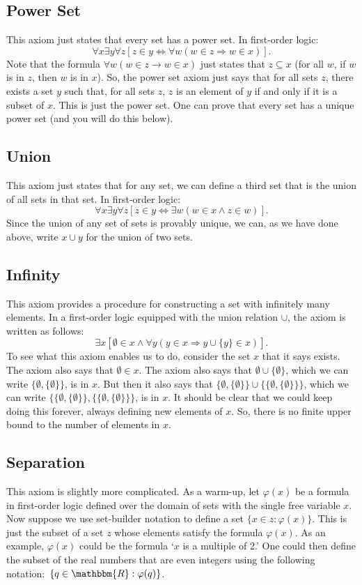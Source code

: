 \documentclass[11pt]{article}
\theoremstyle{definition}
\theoremstyle{remark}
\begin{document}
\subsection{Power Set}
This axiom just states that every set has a power set. In first-order logic:
$$\forall x \exists y \forall z \left[z\in y \iff \forall w (w\in z \Rightarrow w\in x)\right].$$
Note that the formula $\forall w (w\in z \to w\in x)$ just states that $z\subseteq x$ (for all $w$, if $w$ is in $z$, then $w$ is in $x$). So, the power set axiom just says that for all sets $z$, there exists a set $y$ such that, for all sets $z$, $z$ is an element of $y$ if and only if it is a subset of $x$. This is just the power set. One can prove that every set has a unique power set (and you will do this below). 


\subsection{Union}
This axiom just states that for any set, we can define a third set that is the union of all sets in that set. In first-order logic:
$$\forall x \exists y \forall z \left[z\in y \iff \exists w (w\in x \wedge z\in w)\right].$$
Since the union of any set of sets is provably unique, we can, as we have done above, write $x\cup y$ for the union of two sets.


\subsection{Infinity}
This axiom provides a procedure for constructing a set with infinitely many elements. In a first-order logic equipped with the union relation $\cup$, the axiom is written as follows:
$$\exists x \left[\emptyset \in x \wedge \forall y (y\in x \Rightarrow y\cup \{y\}\in x)\right].$$
To see what this axiom enables us to do, consider the set $x$ that it says exists. The axiom also says that $\emptyset\in x$. The axiom also says that $\emptyset \cup \{\emptyset\}$, which we can write $\{\emptyset,\{\emptyset\}\}$, is in $x$. But then it also says that $\{\emptyset,\{\emptyset\}\}\cup\{\{\emptyset,\{\emptyset\}\}\}$, which we can write $\{\{\emptyset,\{\emptyset\}\},\{\{\emptyset,\{\emptyset\}\}\}$, is in $x$. It should be clear that we could keep doing this forever, always defining new elements of $x$. So, there is no finite upper bound to the number of elements in $x$. 


\subsection{Separation}
This axiom is slightly more complicated. As a warm-up, let $\varphi(x)$ be a formula in first-order logic defined over the domain of sets with the single free variable $x$. Now suppose we use set-builder notation to define a set $\{x\in z : \varphi(x)\}$. This is just the subset of a set $z$ whose elements satisfy the formula $\varphi(x)$. As an example, $\varphi(x)$ could be the formula `$x$ is a multiple of 2.' One could then define the subset of the real numbers that are even integers using the following notation:\ $\{q\in\mathbbm{R}:\varphi(q)\}$.\par 
\end{document}
